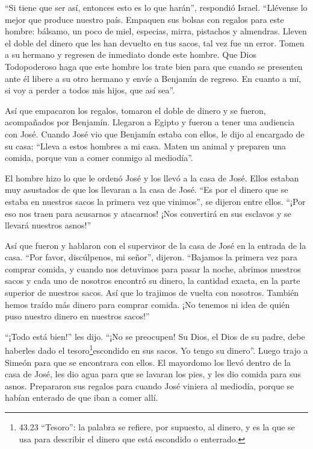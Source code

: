  ``Si tiene que ser así, entonces esto es lo que harán'',
respondió Israel. ``Llévense lo mejor que produce nuestro país. Empaquen
sus bolsas con regalos para este hombre: bálsamo, un poco de miel,
especias, mirra, pistachos y almendras.  Lleven el doble
del dinero que les han devuelto en tus sacos, tal vez fue un error.
 Tomen a su hermano y regresen de inmediato donde este
hombre.  Que Dios Todopoderoso haga que este hombre los
trate bien para que cuando se presenten ante él libere a su otro hermano
y envíe a Benjamín de regreso. En cuanto a mí, si voy a perder a todos
mis hijos, que así sea''.

 Así que empacaron los regalos, tomaron el doble de dinero
y se fueron, acompañados por Benjamín. Llegaron a Egipto y fueron a
tener una audiencia con José.  Cuando José vio que Benjamín
estaba con ellos, le dijo al encargado de su casa: ``Lleva a estos
hombres a mi casa. Maten un animal y preparen una comida, porque van a
comer conmigo al mediodía''.

 El hombre hizo lo que le ordenó José y los llevó a la casa
de José.  Ellos estaban muy asustados de que los llevaran a
la casa de José. ``Es por el dinero que se estaba en nuestros sacos la
primera vez que vinimos'', se dijeron entre ellos. ``¡Por eso nos traen
para acusarnos y atacarnos! ¡Nos convertirá en sus esclavos y se llevará
nuestros asnos!''

 Así que fueron y hablaron con el supervisor de la casa de
José en la entrada de la casa.  ``Por favor, discúlpenos,
mi señor'', dijeron. ``Bajamos la primera vez para comprar comida,
 y cuando nos detuvimos para pasar la noche, abrimos
nuestros sacos y cada uno de nosotros encontró su dinero, la cantidad
exacta, en la parte superior de nuestros sacos. Así que lo trajimos de
vuelta con nosotros.  También hemos traído más dinero para
comprar comida. ¡No tenemos ni idea de quién puso nuestro dinero en
nuestros sacos!''

 ``¡Todo está bien!'' les dijo. ``¡No se preocupen! Su
Dios, el Dios de su padre, debe haberles dado el
tesoro\footnote{43.23 ``Tesoro'': la palabra se refiere, por supuesto,
  al dinero, y es la que se usa para describir el dinero que está
  escondido o enterrado.}escondido en sus sacos. Yo tengo su dinero''.
Luego trajo a Simeón para que se encontrara con ellos.  El
mayordomo los llevó dentro de la casa de José, les dio agua para que se
lavaran los pies, y les dio comida para sus asnos. 
Prepararon sus regalos para cuando José viniera al mediodía, porque se
habían enterado de que iban a comer allí.

